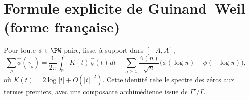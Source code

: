 \section{Formule explicite de Guinand–Weil (forme française)}
Pour toute $\phi\in\PW$ paire, lisse, à support dans $[-A,A]$,
\[
\sum_{\rho}\widehat{\phi}(\gamma_\rho)
=\frac{1}{2\pi}\int_{\mathbb R}K(t)\,\widehat{\phi}(t)\,dt
-\sum_{n\ge1}\frac{\Lambda(n)}{\sqrt{n}}\big(\phi(\log n)+\phi(-\log n)\big),
\]
où $K(t)=2\log|t|+O(|t|^{-2})$.
Cette identité relie le spectre des zéros aux termes premiers, avec une composante archimédienne issue de $\Gamma'/\Gamma$.
